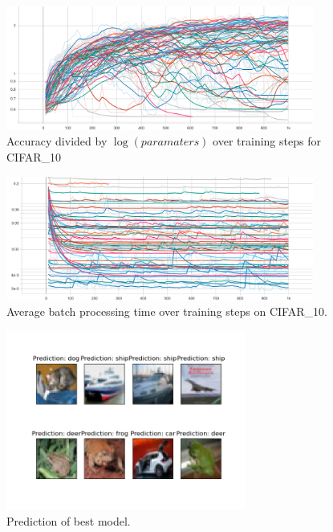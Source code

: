                 \begin{figure}[h]
                        \centering
                        \label{fig:cifar_10_accuracy}
                        \includegraphics[width=0.9\textwidth]{4_results/imgs/cifar_10/Accuracy_vs_log(parameters)}
                    \caption{Accuracy divided by $\log(paramaters)$ over training steps for CIFAR\_10}
                \end{figure}

                \begin{figure}[h]
                        \centering
                        \label{fig:cifar_10_batch}
                        \includegraphics[width=0.9\textwidth]{4_results/imgs/cifar_10/Average_batch_time}
                    \caption{Average batch processing time over training steps on CIFAR\_10.}
                \end{figure}

                \begin{figure}[h]
                        \centering
                        \label{fig:cifar_10_predit}
                        \includegraphics[width=0.7\textwidth]{4_results/imgs/cifar_10/predict}
                    \caption{Prediction of best model.}
                \end{figure}
